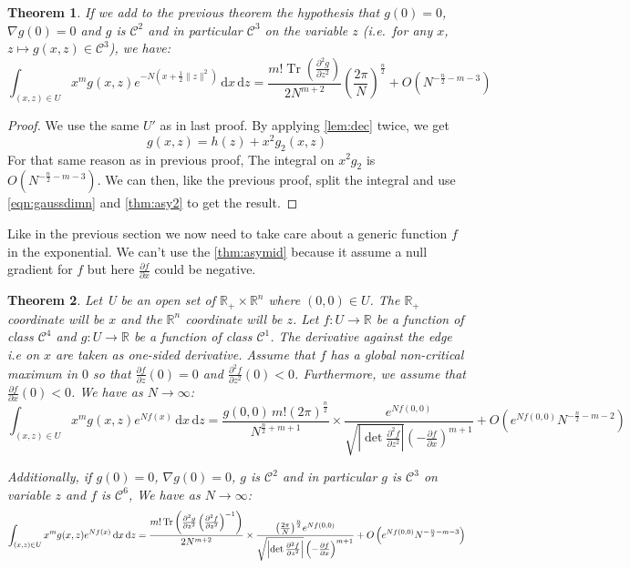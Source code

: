 \documentclass[10pt,a4paper]{report}
\theoremstyle{plain}
\newtheorem{thm}{Theorem}[chapter]
\theoremstyle{definition}
\theoremstyle{remark}
\newcommand{\R}{\ensuremath{\mathbb{R}}}
\newcommand{\dd}{\mathrm{d}}
\newcommand{\dpar}[2]{\frac{\partial{#1}}{\partial{#2}}}
\newcommand{\dparn}[3]{\frac{\partial^{#3} {#1}}{\partial{#2}^{#3}}}
\DeclareMathOperator{\Tr}{Tr}
\newcommand{\class}[1]{{\mathscr{C}^{#1}}}
\begin{document}
\begin{thm}\label{thm:asyp2}
  If we add to the previous theorem the hypothesis that $g(0) = 0$, $\nabla g(0) =
  0$ and $g$ is $\class 2$ and in particular $\class 3$ on the
  variable $z$ (i.e.\ for any $x$, $z \mapsto g(x,z) \in \class 3$), we have:
  \[\int_{(x,z) \in U} x^m g(x,z)e^{-N(x + \frac 12 \|z\|^2)} \,\dd x\, \dd z
    = \frac{m!\Tr\left(\dparn g z 2\right)}{2N^{m+2}}
    {\left(\frac {2\pi}{N}\right)}^{\frac n 2}
    + O\left({N^{-\frac n 2 -m -3}}\right)\]
\end{thm}

\begin{proof}
  We use the same $U'$ as in last proof.
  By applying \cref{lem:dec} twice, we get
  \[g(x,z) = h(z) + x^2g_2(x,z)\]
  For that same reason as in previous proof, The integral on $x^2g_2$ is
  $O(N^{-\frac n2 - m - 3})$. We can then, like the previous proof, split the
  integral and use \cref{eqn:gaussdimn} and \cref{thm:asy2} to get the result.
\end{proof}

Like in the previous section we now need to take care about a generic function
$f$ in the exponential. We can't use the \cref{thm:asymid} because it assume a
null gradient for $f$ but here $\dpar f x$ could be negative.

\begin{thm}\label{thm:asypmid}
   Let U be an open set of $\R_+ \times \R^n$ where $(0,0) \in U$. The $\R_+$
  coordinate will be $x$ and the $\R^n$ coordinate will be $z$. Let $f:U \to \R$
  be a function of class $\class 4$ and $g : U \to
  \R$ be a function of class $\class 1$. The derivative against the edge i.e on $x$ are
  taken as one-sided derivative. Assume that $f$ has a global non-critical
  maximum in $0$ so that $\dpar f z(0) = 0$ and $\dparn f z 2(0) < 0$. Furthermore, we
  assume that $\dpar f x(0) < 0$. We have as $N \to \infty$:
  \[\int_{(x,z) \in U} x^m g(x,z)e^{Nf(x)} \,\dd x\, \dd z =
    \frac{g(0,0)\,m! {(2\pi)}^{\frac n 2}}{N^{\frac n 2 + m + 1}} \times
    \frac{e^{Nf(0,0)}}
    {\sqrt{\left|\det \dparn f z 2\right|} \left(-\dpar f x\right)^{m+1}}
    + O(e^{Nf(0,0)}N^{-\frac n 2 - m - 2})\]

  Additionally, if $g(0) = 0$, $\nabla g(0) = 0$, $g$ is $\class 2$ and in
  particular $g$ is $\class 3$ on
  variable $z$ and $f$ is $\class 6$, We have as $N \to \infty$:
   \[\int_{(x,z) \in U} x^m g(x,z)e^{Nf(x)} \,\dd x\, \dd z
    = \frac{m!\Tr\left(\dparn g z 2 \left( \dparn f z 2 \right)\inv\right)}{2N^{m+2}}
     \times
    \frac{{\left(\frac {2\pi}{N}\right)}^{\frac n 2}e^{Nf(0,0)}}
    {\sqrt{\left|\det \dparn f z 2\right|} \left(-\dpar f x\right)^{m+1}}
    + O\left(e^{Nf(0,0)}{N^{-\frac n 2 -m -3}}\right)\]
\end{thm}
\end{document}
